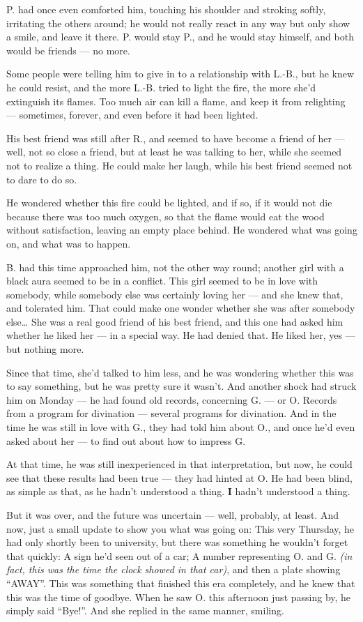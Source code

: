 P. had once even comforted him, touching his shoulder and stroking softly, irritating the others around; he would not really react in any way but only show a smile, and leave it there. P. would stay P., and he would stay himself, and both would be friends --- no more.

Some people were telling him to give in to a relationship with L.-B., but he knew he could resist, and the more L.-B. tried to light the fire, the more she'd extinguish its flames. Too much air can kill a flame, and keep it from relighting --- sometimes, forever, and even before it had been lighted.

His best friend was still after R., and seemed to have become a friend of her --- well, not so close a friend, but at least he was talking to her, while she seemed not to realize a thing. He could make her laugh, while his best friend seemed not to dare to do so.

He wondered whether this fire could be lighted, and if so, if it would not die because there was too much oxygen, so that the flame would eat the wood without satisfaction, leaving an empty place behind. 
He wondered what was going on, and what was to happen.

B. had this time approached him, not the other way round; another girl with a black aura seemed to be in a conflict. This girl seemed to be in love with somebody, while somebody else was certainly loving her --- and she knew that, and tolerated him. That could make one wonder whether she was after somebody else\dots{}
She was a real good friend of his best friend, and this one had asked him whether he liked her --- in a special way. 
He had denied that. He liked her, yes --- but nothing more.

Since that time, she'd talked to him less, and he was wondering whether this was to say something, but he was pretty sure it wasn't. 
And another shock had struck him on Monday --- he had found old records, concerning G. --- or O. Records from a program for divination --- several programs for divination. And in the time he was still in love with G., they had told him about O., and once he'd even asked about her --- to find out about how to impress G.

At that time, he was still inexperienced in that interpretation, but now, he could see that these results had been true --- they had hinted at O. 
He had been blind, as simple as that, as he hadn't understood a thing. 
\textbf{I} hadn't understood a thing.

But it was over, and the future was uncertain --- well, probably, at least. 
And now, just a small update to show you what was going on: This very Thursday, he had only shortly been to university, but there was something he wouldn't forget that quickly: A sign he'd seen out of a car; A number representing O. and G. \emph{(in fact, this was the time the clock showed in that car)}, and then a plate showing \enquote{AWAY}. This was something that finished this era completely, and he knew that this was the time of goodbye. When he saw O. this afternoon just passing by, he simply said \enquote{Bye!}. 
And she replied in the same manner, smiling.

